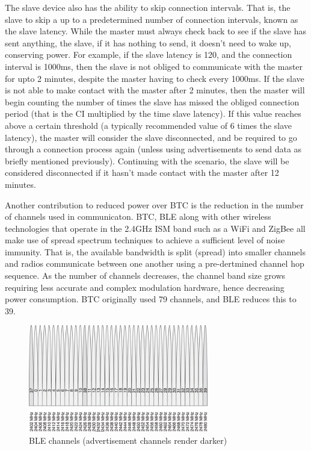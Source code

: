 \documentclass[]{article}
\begin{document}
The slave device also has the ability to skip connection intervals. That is, the slave to skip a up to a predetermined number of connection intervals, known as the slave latency. While the master must always check back to see if the slave has sent anything, the slave, if it has nothing to send, it doesn't need to wake up, conserving power. For example, if the slave latency is 120, and the connection interval is 1000ms, then the slave is not obliged to communicate with the master for upto 2 minutes, despite the master having to check every 1000ms. If the slave is not able to make contact with the master after 2 minutes, then the master will begin counting the number of times the slave has missed the obliged connection period (that is the \ac{CI} multiplied by the time slave latency). If this value reaches above a certain threshold (a typically recommended value of 6 times the slave latency), the master will consider the slave disconnected, and be required to go through a connection process again (unless using advertisements to send data as briefly mentioned previously). Continuing with the scenario, the slave will be considered disconnected if it hasn't made contact with the master after 12 minutes.

Another contribution to reduced power over \ac{BTC} is the reduction in the number of channels used in communicaton. \ac{BTC}, \ac{BLE} along with other wireless technologies that operate in the 2.4GHz ISM band such as a WiFi and ZigBee all make use of spread spectrum techniques to achieve a sufficient level of noise immunity. That is, the available bandwidth is split (spread) into smaller channels and radios communicate between one another using a pre-dertmined channel hop sequence. As the number of channels decreases, the channel band size grows requiring less accurate and complex modulation hardware, hence decreasing power consumption. \ac{BTC} originally used 79 channels, and \ac{BLE} reduces this to 39.

\begin{figure}[htb]
	\begin{center}
		\includegraphics[width = 0.7\textwidth]{blechannels}
	\end{center}
	\caption{\ac{BLE} channels (advertisement channels render darker)}
	\label{fig:blechannels}
\end{figure}
\end{document}

